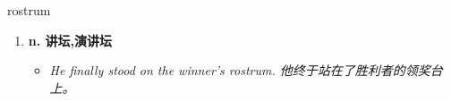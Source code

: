 
\begin{frame}
{\huge rostrum}
\begin{center}
\begin{enumerate}\Large
  \item \textbf{n. 讲坛,演讲坛}
  \begin{itemize}
    \item \em{\Large{He finally stood on the winner's rostrum. 他终于站在了胜利者的领奖台上。}}
  \end{itemize}
\end{enumerate}
\end{center}
\end{frame}
